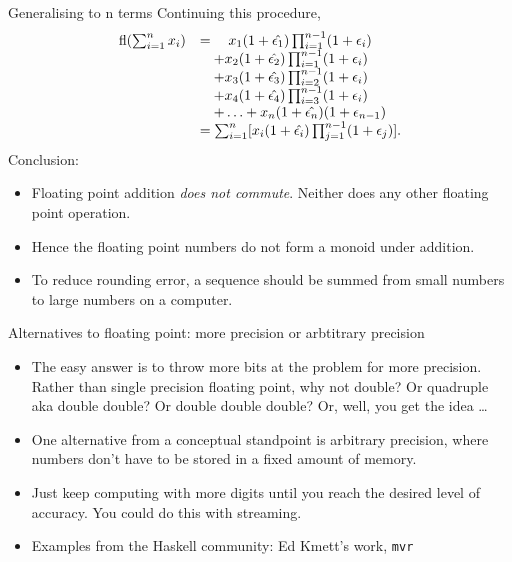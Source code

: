 \documentclass{beamer}
\begin{document}
\begin{frame}{Generalising to n terms}
Continuing this procedure,
\begin{equation*}
\begin{array}{rl}
\text{fl}(\sum_{i=1}^n x_i) &= \quad x_1 (1 + \hat{\epsilon_1}) \prod_{i=1}^{n-1} (1 + \epsilon_i) \\
&\quad + x_2 (1 + \hat{\epsilon_2}) \prod_{i=1}^{n-1} (1 + \epsilon_i) \\
&\quad + x_3 (1 + \hat{\epsilon_3}) \prod_{i=2}^{n-1} (1 + \epsilon_i) \\
&\quad + x_4 (1 + \hat{\epsilon_4}) \prod_{i=3}^{n-1} (1 + \epsilon_i) \\
&\quad + \ldots + x_n (1 + \hat{\epsilon_n}) (1 + \epsilon_{n-1}) \\
&= \sum_{i=1}^n [x_i (1 + \hat{\epsilon_i}) \prod_{j=1}^{n-1} (1 + \epsilon_j)].
\end{array}
\end{equation*}
Conclusion: 
\begin{itemize}
\item Floating point addition \emph{does not commute}. Neither does any other floating point
operation.
\item Hence the floating point numbers do not form a monoid under addition.\\
\item To reduce rounding error, a sequence should be summed from small numbers to large numbers on a
computer.
\end{itemize}
\end{frame}

\begin{frame}{Alternatives to floating point: more precision or arbtitrary precision}
\begin{itemize}
\item The easy answer is to throw more bits at the problem for more precision. Rather than single precision floating point, why not double? Or
quadruple aka double double? Or double double double? Or, well, you get the idea \ldots
\item One alternative from a conceptual standpoint is arbitrary precision, where numbers don't have to be
stored in a fixed amount of memory.
\item Just keep computing with more digits until you reach the desired level of accuracy. You could do this with
streaming.
\item Examples from the Haskell community: Ed Kmett's work, \texttt{mvr}
\end{itemize}
\end{frame}
\end{document}
